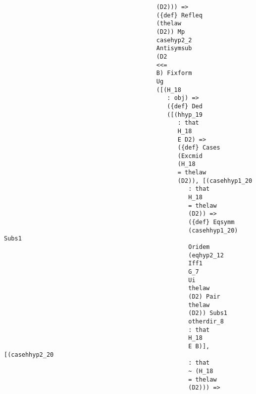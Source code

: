 \documentclass[12pt]{article}
\begin{document}
\begin{verbatim}
                                           (D2))) => 
                                           ({def} Refleq 
                                           (thelaw 
                                           (D2)) Mp 
                                           casehyp2_2 
                                           Antisymsub 
                                           (D2 
                                           <<= 
                                           B) Fixform 
                                           Ug 
                                           ([(H_18 
                                              : obj) => 
                                              ({def} Ded 
                                              ([(hhyp_19 
                                                 : that 
                                                 H_18 
                                                 E D2) => 
                                                 ({def} Cases 
                                                 (Excmid 
                                                 (H_18 
                                                 = thelaw 
                                                 (D2)), [(casehhyp1_20 
                                                    : that 
                                                    H_18 
                                                    = thelaw 
                                                    (D2)) => 
                                                    ({def} Eqsymm 
                                                    (casehhyp1_20) Subs1 
                                                    Oridem 
                                                    (eqhyp2_12 
                                                    Iff1 
                                                    G_7 
                                                    Ui 
                                                    thelaw 
                                                    (D2) Pair 
                                                    thelaw 
                                                    (D2)) Subs1 
                                                    otherdir_8 
                                                    : that 
                                                    H_18 
                                                    E B)], [(casehhyp2_20 
                                                    : that 
                                                    ~ (H_18 
                                                    = thelaw 
                                                    (D2))) => 

\end{verbatim}
\end{document}
